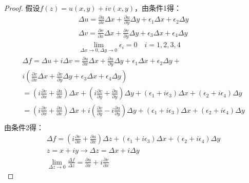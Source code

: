 \documentclass[10pt, a4paper, oneside]{ctexbook}
\begin{document}
\begin{proof}
    假设$f(z)=u(x,y)+iv(x,y)$，由条件1得：
    \begin{align*}
        \Delta u=\frac{\partial u}{\partial x}\Delta x+\frac{\partial u}{\partial y}\Delta y+\epsilon_1\Delta x+\epsilon_2 \Delta y \\
        \Delta v=\frac{\partial v}{\partial x}\Delta x+\frac{\partial v}{\partial y}\Delta y+\epsilon_3\Delta x+\epsilon_4 \Delta y \\
        \lim_{ \Delta x \to 0, \Delta y \to 0}  \epsilon_i =0 \quad i=1,2,3,4
    \end{align*}
    \begin{align*}
        \Delta f=\Delta u + i \Delta v=\frac{\partial u}{\partial x}\Delta x+\frac{\partial u}{\partial y}\Delta y+\epsilon_1\Delta x+\epsilon_2 \Delta y+                                                                                             \\
        i\left( \frac{\partial v}{\partial x}\Delta x+\frac{\partial v}{\partial y}\Delta y+\epsilon_3\Delta x+\epsilon_4 \Delta y \right)                                                                                                             \\
        =\left(i\frac{\partial v}{\partial x}+\frac{\partial u}{\partial x}\right) \Delta x + \left(i\frac{\partial v}{\partial y}+\frac{\partial u}{\partial y}\right) \Delta y  +(\epsilon_1+i\epsilon_3)\Delta x +(\epsilon_2+i\epsilon_4)\Delta y  \\
        =\left(i\frac{\partial v}{\partial x}+\frac{\partial u}{\partial x}\right) \Delta x + i\left(\frac{\partial v}{\partial y}-i\frac{\partial u}{\partial y}\right) \Delta y  +(\epsilon_1+i\epsilon_3)\Delta x +(\epsilon_2+i\epsilon_4)\Delta y \\
    \end{align*}
    由条件2得：
    \begin{align*}
        \Delta f=\left(i\frac{\partial v}{\partial x}+\frac{\partial u}{\partial x}\right) \Delta z  +(\epsilon_1+i\epsilon_3)\Delta x +(\epsilon_2+i\epsilon_4)\Delta y \\
        z=x+iy\to\Delta z= \Delta x+i\Delta y                                                                                                                            \\
        \lim_{\Delta z \to 0} \frac{\Delta f}{\Delta z} = \frac{\partial u}{\partial x}+i\frac{\partial v}{\partial x}
    \end{align*}
\end{proof}
\end{document}
